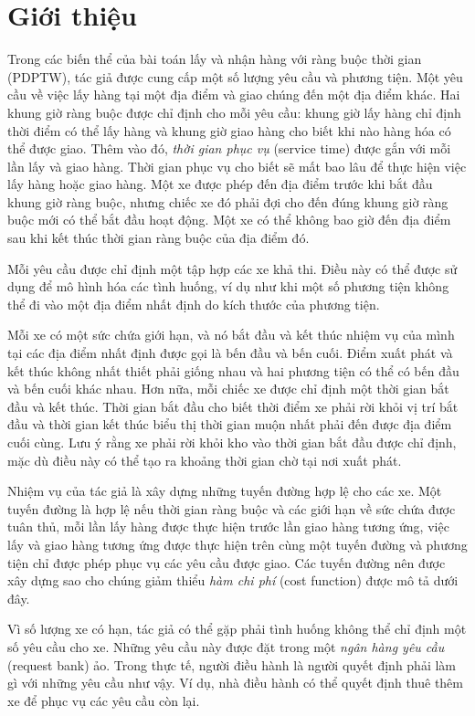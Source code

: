 \chapter*{Giới thiệu}
Trong các biến thể của bài toán lấy và nhận hàng với ràng buộc thời gian (PDPTW), tác giả được cung cấp một số lượng yêu cầu và phương tiện. Một yêu cầu về việc lấy hàng tại một địa điểm và giao chúng đến một địa điểm khác. Hai khung giờ ràng buộc được chỉ định cho mỗi yêu cầu: khung giờ lấy hàng chỉ định thời điểm có thể lấy hàng và khung giờ giao hàng cho biết khi nào hàng hóa có thể được giao. Thêm vào đó, \textit{thời gian phục vụ} (service time) được gắn với mỗi lần lấy và giao hàng. Thời gian phục vụ cho biết sẽ mất bao lâu để thực hiện việc lấy hàng hoặc giao hàng. Một xe được phép đến địa điểm trước khi bắt đầu khung giờ ràng buộc, nhưng chiếc xe đó phải đợi cho đến đúng khung giờ ràng buộc mới có thể bắt đầu hoạt động. Một xe có thể không bao giờ đến địa điểm sau khi kết thúc thời gian ràng buộc của địa điểm đó.

Mỗi yêu cầu được chỉ định một tập hợp các xe khả thi. Điều này có thể được sử dụng để mô hình hóa các tình huống, ví dụ như khi một số phương tiện không thể đi vào một địa điểm nhất định do kích thước của phương tiện.

Mỗi xe có một sức chứa giới hạn, và nó bắt đầu và kết thúc nhiệm vụ của mình tại các địa điểm nhất định được gọi là bến đầu và bến cuối. Điểm xuất phát và kết thúc không nhất thiết phải giống nhau và hai phương tiện có thể có bến đầu và bến cuối khác nhau. Hơn nữa, mỗi chiếc xe được chỉ định một thời gian bắt đầu và kết thúc. Thời gian bắt đầu cho biết thời điểm xe phải rời khỏi vị trí bắt đầu và thời gian kết thúc biểu thị thời gian muộn nhất phải đến được địa điểm cuối cùng. Lưu ý rằng xe phải rời khỏi kho vào thời gian bắt đầu được chỉ định, mặc dù điều này có thể tạo ra khoảng thời gian chờ tại nơi xuất phát.

Nhiệm vụ của tác giả là xây dựng những tuyến đường hợp lệ cho các xe. Một tuyến đường là hợp lệ nếu thời gian ràng buộc và các giới hạn về sức chứa được tuân thủ, mỗi lần lấy hàng được thực hiện trước lần giao hàng tương ứng, việc lấy và giao hàng tương ứng được thực hiện trên cùng một tuyến đường và phương tiện chỉ được phép phục vụ các yêu cầu được giao. Các tuyến đường nên được xây dựng sao cho chúng giảm thiểu \textit{hàm chi phí} (cost function) được mô tả dưới đây.

Vì số lượng xe có hạn, tác giả có thể gặp phải tình huống không thể chỉ định một số yêu cầu cho xe. Những yêu cầu này được đặt trong một \textit{ngân hàng yêu cầu} (request bank) ảo. Trong thực tế, người điều hành là người quyết định phải làm gì với những yêu cầu như vậy. Ví dụ, nhà điều hành có thể quyết định thuê thêm xe để phục vụ các yêu cầu còn lại.

